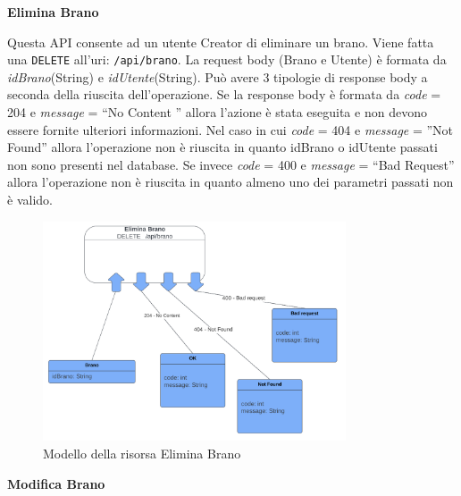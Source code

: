 \documentclass[a4paper,12pt]{article}
\begin{document}
\textbf{Elimina Brano}

Questa API consente ad un utente Creator di eliminare un brano. Viene fatta una \texttt{DELETE} all’uri: \texttt{/api/brano}.
La request body (Brano e Utente) è formata da \textit{idBrano}(String) e \textit{idUtente}(String). \newline
Può avere 3 tipologie di response body a seconda della riuscita dell’operazione. \newline
Se la response body è formata da \textit{code} = 204 e \textit{message} = “No Content ” allora l'azione è stata eseguita e non devono essere fornite ulteriori informazioni. \newline
Nel caso in cui \textit{code} = 404  e \textit{message} = ”Not Found” allora l’operazione non è riuscita in quanto idBrano o idUtente passati non sono presenti nel database. \newline
Se invece \textit{code} = 400 e \textit{message} = “Bad Request” allora l’operazione non è riuscita in quanto almeno uno dei parametri passati non è valido.

\begin{figure}[htp]
    \centering
    \includegraphics[width=0.8\textwidth]{resource-models/elimina-brano.png}
    \caption{Modello della risorsa Elimina Brano}
\end{figure}

\textbf{Modifica Brano}
\end{document}
